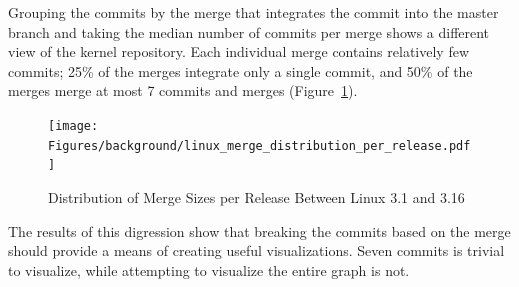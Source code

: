 Grouping the commits by the merge that integrates the commit into the
master branch and taking the median number of commits per merge shows a
different view of the kernel repository.
Each individual merge contains relatively few commits; 25\% of the
merges integrate only a single commit, and 50\% of the merges merge
at most 7 commits and merges
(Figure~\ref{fig:linux_merge_distribution_per_release}).

\begin{figure}[htpb]
  \centering
  \texttt{[image: Figures/background/linux\_merge\_distribution\_per\_release.pdf]}
  \caption{Distribution of Merge Sizes per Release Between Linux 3.1 and
  3.16}
  \label{fig:linux_merge_distribution_per_release}
\end{figure}

The results of this digression show that breaking the commits based on
the merge should provide a means of creating useful visualizations.
Seven commits is trivial to visualize, while attempting to visualize the
entire graph is not.

